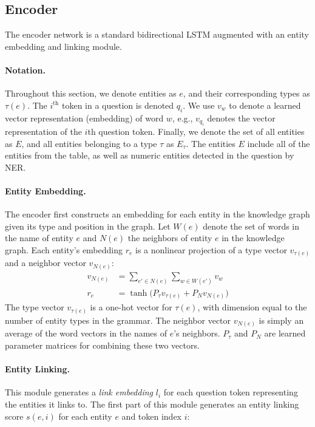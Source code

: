\subsection{Encoder}
\label{sec:nnsp_encoder}

The encoder network is a standard bidirectional LSTM augmented with an entity 
embedding and linking module.

\paragraph{Notation.}
Throughout this section, we denote entities as $e$, and their corresponding 
types as $\tau(e)$. The $i^{\text{th}}$ token in a question is denoted $q_i$. 
We use $v_w$ to denote a learned vector representation (embedding) of word $w$, 
e.g., $v_{q_i}$ denotes the vector representation of the $i$th question token. 
Finally, we denote the set of all entities as $E$, and all entities belonging 
to a type $\tau$ as $E_{\tau}$. The entities $E$ include all of the entities 
from the table, as well as numeric entities detected in the question by NER. 

\paragraph{Entity Embedding.}
The encoder first constructs an embedding for each entity in the knowledge 
graph given its type and position in the graph. 
Let $W(e)$ denote the set of words in the name of entity $e$ and $N(e)$ the 
neighbors of entity $e$ in the knowledge graph.
Each entity's embedding $r_e$ is a nonlinear projection of a type vector 
$v_{\tau(e)}$ and a neighbor vector $v_{N(e)}$:
\begin{align}
    v_{N(e)} &= \sum_{e' \in N(e)}\sum_{w \in W(e')}v_w \\
    r_e &= \tanh\big(P_\tau v_{\tau(e)} + P_N v_{N(e)}\big)
\end{align}
The type vector $v_{\tau(e)}$ is a one-hot vector for $\tau(e)$, with dimension 
equal to the number of entity types in the grammar. The neighbor vector 
$v_{N(e)}$ is simply an average of the word vectors in the names of $e$'s 
neighbors. $P_\tau$ and $P_N$ are learned parameter matrices for combining 
these two vectors.

\paragraph{Entity Linking.}
This module generates a \emph{link embedding} $l_{i}$ for each question token 
representing the entities it links to.
The first part of this module generates an entity linking score $s(e,i)$ 
for each entity $e$ and token index $i$:

